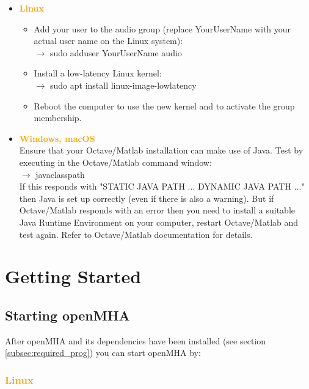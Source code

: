 \documentclass[11pt,a4paper,twoside]{article}
\newcommand{\+}{\discretionary{\mbox{\scriptsize$\hookleftarrow$}}{}{}}
\begin{document}
\begin{itemize}
\item \textcolor{orange}{\textbf{Linux}}
  \begin{itemize}
  \item Add your user to the {\ttfamily audio} group (replace {\ttfamily
    YourUserName} with your actual user name on the Linux system): \\
    $\rightarrow$ {\ttfamily sudo adduser YourUserName audio}
  \item Install a low-latency Linux kernel: \\
    $\rightarrow$ {\ttfamily sudo apt install linux-image-lowlatency}
  \item Reboot the computer to use the new kernel and to activate the group
    membership.
  \end{itemize}
\item \textcolor{orange}{\textbf{Windows, macOS}} \\
  Ensure that your Octave/Matlab installation can make use of Java.
  Test by executing in the Octave/Matlab command window: \\
  $\rightarrow$ {\ttfamily javaclasspath} \\
  If this responds with "STATIC JAVA PATH ... DYNAMIC JAVA PATH ..." then
  Java is set up correctly (even if there is also a warning).
  But if Octave/Matlab responds with an error then you need to install a
  suitable Java Runtime Environment on your computer, restart Octave/Matlab
  and test again. Refer to Octave/Matlab documentation for details.
\end{itemize}

\section{Getting Started}

\subsection{Starting openMHA}
\label{starting_openmha}
    
After openMHA and its dependencies have been installed
(see section \ref{subsec:required_prog}) you can start openMHA by: 

\subsubsection*{\textcolor{orange}{\textbf{Linux}}}
\end{document}
